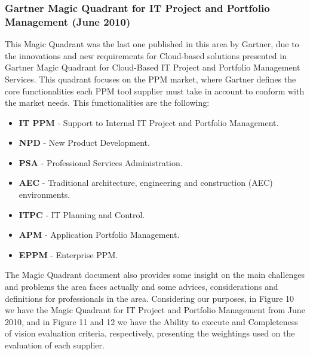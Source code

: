 \subsubsection{Gartner Magic Quadrant for IT Project and Portfolio Management (June 2010)}

This Magic Quadrant was the last one published in this area by Gartner, due to the innovations and new requirements for Cloud-based solutions presented in Gartner Magic Quadrant for Cloud-Based IT Project and Portfolio Management Services\cite{magicQuadrantCloud}.
This quadrant focuses on the PPM market, where Gartner defines the core functionalities each PPM tool supplier must take in account to conform with the market needs. This functionalities are the following:

\begin{itemize}
\item \textbf{IT PPM} - Support to Internal IT Project and Portfolio Management.
\item \textbf{NPD} - New Product Development.
\item \textbf{PSA} - Professional Services Administration.
\item \textbf{AEC} - Traditional architecture, engineering and construction (AEC) environments.
\item \textbf{ITPC} - IT Planning and Control.
\item \textbf{APM} - Application Portfolio Management.
\item \textbf{EPPM} - Enterprise PPM.
\end{itemize}

The Magic Quadrant document\cite{magicQuadrantPPM} also provides some insight on the main challenges and problems the area faces actually and some advices, considerations and definitions for professionals in the area. Considering our purposes, in Figure 10 we have the Magic Quadrant for IT Project and Portfolio Management from June 2010, and in Figure 11 and 12 we have the Ability to execute and Completeness of vision evaluation criteria, respectively, presenting the weightings used on the evaluation of each supplier.\par

